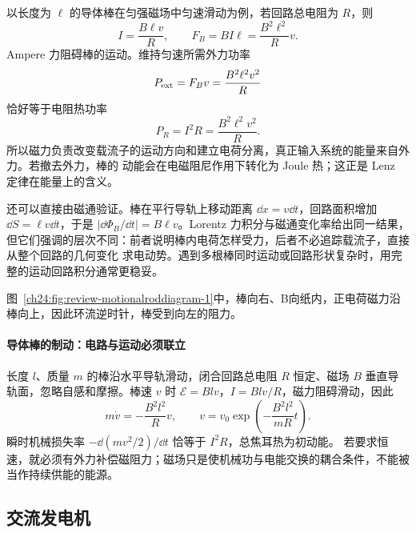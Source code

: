 以长度为 $\ell$ 的导体棒在匀强磁场中匀速滑动为例，若回路总电阻为 $R$，则
\begin{equation}
  I=\frac{B\ell v}{R},\qquad
  F_B=BI\ell=\frac{B^2\ell^2}{R}v.
\end{equation}
Ampere 力阻碍棒的运动。维持匀速所需外力功率
\begin{equation}
  P_{\rm ext}=F_Bv=\frac{B^2\ell^2v^2}{R}
\end{equation}
恰好等于电阻热功率
\begin{equation}
  P_R=I^2R=\frac{B^2\ell^2v^2}{R}.
\end{equation}
所以磁力负责改变载流子的运动方向和建立电荷分离，真正输入系统的能量来自外力。若撤去外力，棒的
动能会在电磁阻尼作用下转化为 Joule 热；这正是 Lenz 定律在能量上的含义。

还可以直接由磁通验证。棒在平行导轨上移动距离 $\dd x=v\dd t$，回路面积增加
$\dd S=\ell v\dd t$，于是 $|\dd\Phi_B/\dd t|=B\ell v$。Lorentz 力积分与磁通变化率给出同一结果，
但它们强调的层次不同：前者说明棒内电荷怎样受力，后者不必追踪载流子，直接从整个回路的几何变化
求电动势。遇到多根棒同时运动或回路形状复杂时，用完整的运动回路积分通常更稳妥。

图~\ref{ch24:fig:review-motionalroddiagram-1}中，棒向右、B向纸内，正电荷磁力沿棒向上，因此环流逆时针，棒受到向左的阻力。
\par\noindent\begin{minipage}{\linewidth}
\motionalRodDiagram
{}\label{ch24:fig:review-motionalroddiagram-1}
\end{minipage}\par\medskip


\paragraph{导体棒的制动：电路与运动必须联立}
长度 $l$、质量 $m$ 的棒沿水平导轨滑动，闭合回路总电阻 $R$ 恒定、磁场 $B$ 垂直导轨面，忽略自感和摩擦。棒速 $v$ 时
$\mathcal E=Blv$，$I=Blv/R$，磁力阻碍滑动，因此
\[
 m\dot v=-\frac{B^2l^2}{R}v,\qquad
 v=v_0\exp\left(-\frac{B^2l^2}{mR}t\right).
\]
瞬时机械损失率 $-\dd(mv^2/2)/\dd t$ 恰等于 $I^2R$，总焦耳热为初动能。
若要求恒速，就必须有外力补偿磁阻力；磁场只是使机械功与电能交换的耦合条件，不能被当作持续供能的能源。

\subsection{交流发电机}

